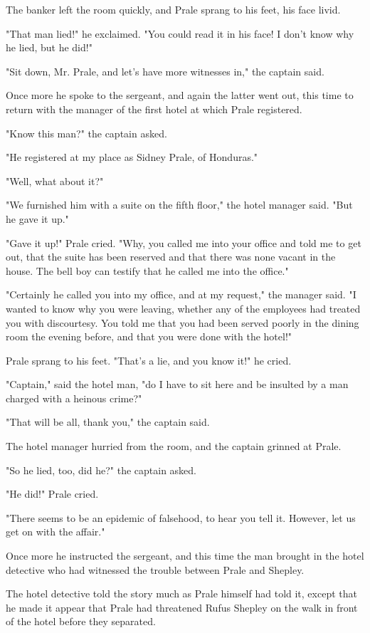 \documentclass{novel}
\begin{document}
The banker left the room quickly, and Prale sprang to his feet, his face livid.

"That man lied!" he exclaimed. "You could read it in his face! I don't know why he lied, but he did!"

"Sit down, Mr. Prale, and let's have more witnesses in," the captain said.

Once more he spoke to the sergeant, and again the latter went out, this time to return with the manager of the first hotel at which Prale registered.

"Know this man?" the captain asked.

"He registered at my place as Sidney Prale, of Honduras."

"Well, what about it?"

"We furnished him with a suite on the fifth floor," the hotel manager said. "But he gave it up."

"Gave it up!" Prale cried. "Why, you called me into your office and told me to get out, that the suite has been reserved and that there was none vacant in the house. The bell boy can testify that he called me into the office."

"Certainly he called you into my office, and at my request," the manager said. "I wanted to know why you were leaving, whether any of the employees had treated you with discourtesy. You told me that you had been served poorly in the dining room the evening before, and that you were done with the hotel!"

Prale sprang to his feet. "That's a lie, and you know it!" he cried.

"Captain," said the hotel man, "do I have to sit here and be insulted by a man charged with a heinous crime?"

"That will be all, thank you," the captain said.

The hotel manager hurried from the room, and the captain grinned at Prale.

"So he lied, too, did he?" the captain asked.

"He did!" Prale cried.

"There seems to be an epidemic of falsehood, to hear you tell it. However, let us get on with the affair."

Once more he instructed the sergeant, and this time the man brought in the hotel detective who had witnessed the trouble between Prale and Shepley.

The hotel detective told the story much as Prale himself had told it, except that he made it appear that Prale had threatened Rufus Shepley on the walk in front of the hotel before they separated.
\end{document}

